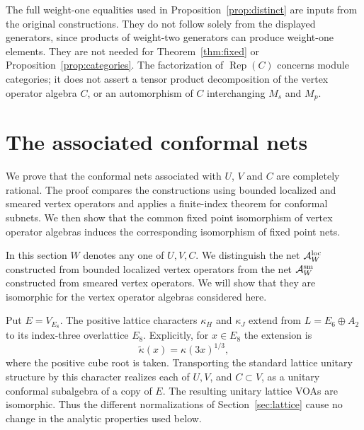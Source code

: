 \documentclass[11pt,reqno]{amsart}
\theoremstyle{definition}\newtheorem{definition}[theorem]{Definition}
\theoremstyle{remark}\newtheorem{remark}[theorem]{Remark}
\newcommand{\Rep}{\operatorname{Rep}}
\numberwithin{equation}{section}
\begin{document}
The full weight-one equalities used in Proposition~\ref{prop:distinct} are inputs from the original constructions. They do not follow solely from the displayed generators, since products of weight-two generators can produce weight-one elements. They are not needed for Theorem~\ref{thm:fixed} or Proposition~\ref{prop:categories}. The factorization of $\Rep(C)$ concerns module categories; it does not assert a tensor product decomposition of the vertex operator algebra $C$, or an automorphism of $C$ interchanging $M_s$ and $M_p$.
\par\endgroup


\section{The associated conformal nets}\label{sec:nets}
We prove that the conformal nets associated with $U$, $V$ and $C$ are completely rational. The proof compares the constructions using bounded localized and smeared vertex operators and applies a finite-index theorem for conformal subnets. We then show that the common fixed point isomorphism of vertex operator algebras induces the corresponding isomorphism of fixed point nets.

In this section $W$ denotes any one of $U,V,C$. We distinguish the net $\mathcal A_W^{\rm loc}$ constructed from bounded localized vertex operators from the net $\mathcal A_W^{\rm sm}$ constructed from smeared vertex operators. We will show that they are isomorphic for the vertex operator algebras considered here.

Put $E=V_{E_8}$. The positive lattice characters $\kappa_H$ and $\kappa_J$ extend from $L=E_6\oplus A_2$ to its index-three overlattice $E_8$. Explicitly, for $x\in E_8$ the extension is
\[
 \widetilde\kappa(x)=\kappa(3x)^{1/3},
\]
where the positive cube root is taken. Transporting the standard lattice unitary structure by this character realizes each of $U,V$, and $C\subset V$, as a unitary conformal subalgebra of a copy of $E$. The resulting unitary lattice VOAs are isomorphic. Thus the different normalizations of Section~\ref{sec:lattice} cause no change in the analytic properties used below.
\end{document}
